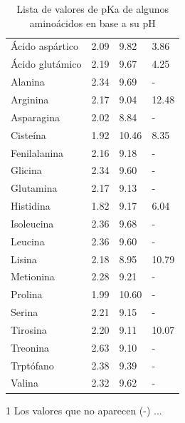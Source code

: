 \begin{table}
\centering

\caption{Lista de valores de pKa de algunos aminoácidos en base a su pH}
\label{tab:pka_aminoácidos}

\begin{threeparttable}{
\begin{tabular}{M{0.2\textwidth}M{0.2\textwidth}M{0.2\textwidth}M{0.2\textwidth}}\hline

     &
     &
     &
     \\ \hline
    
    Ácido aspártico & 2.09 & 9.82 & 3.86 \\
    Ácido glutámico & 2.19 & 9.67 & 4.25 \\
    Alanina & 2.34 & 9.69 & - \\
    Arginina & 2.17 & 9.04 & 12.48 \\
    Asparagina & 2.02 & 8.84 & - \\
    Cisteína & 1.92 & 10.46 & 8.35 \\
    Fenilalanina & 2.16 & 9.18 & - \\
    Glicina & 2.34 & 9.60 & - \\
    Glutamina & 2.17 & 9.13 & - \\
    Histidina & 1.82 & 9.17 & 6.04 \\
    Isoleucina & 2.36 & 9.68 & - \\
    Leucina & 2.36 & 9.60 & - \\
    Lisina & 2.18 & 8.95 & 10.79 \\
    Metionina & 2.28 & 9.21 & - \\
    Prolina & 1.99 & 10.60 & - \\
    Serina & 2.21 & 9.15 & - \\
    Tirosina & 2.20 & 9.11 & 10.07 \\
    Treonina & 2.63 & 9.10 & - \\
    Trptófano & 2.38 & 9.39 & - \\
    Valina & 2.32 & 9.62 & - \\
    
    \hline
\end{tabular}}

\begin{tablenotes} %
    \item[1] Los valores que no aparecen (-) ...
\end{tablenotes}

\end{threeparttable}\end{table}